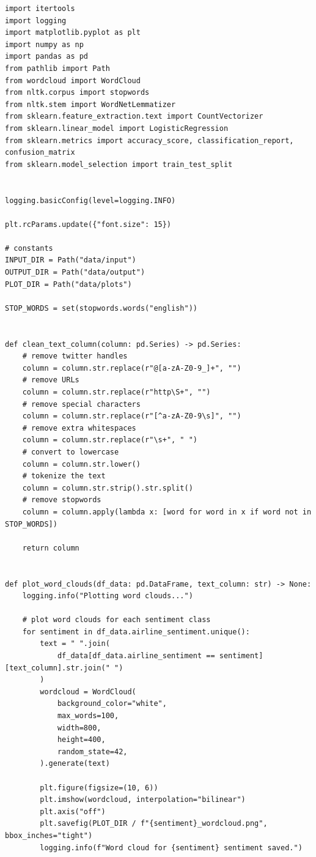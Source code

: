 \documentclass{article}
\begin{document}
\begin{lstlisting}
import itertools
import logging
import matplotlib.pyplot as plt
import numpy as np
import pandas as pd
from pathlib import Path
from wordcloud import WordCloud
from nltk.corpus import stopwords
from nltk.stem import WordNetLemmatizer
from sklearn.feature_extraction.text import CountVectorizer
from sklearn.linear_model import LogisticRegression
from sklearn.metrics import accuracy_score, classification_report, confusion_matrix
from sklearn.model_selection import train_test_split


logging.basicConfig(level=logging.INFO)

plt.rcParams.update({"font.size": 15})

# constants
INPUT_DIR = Path("data/input")
OUTPUT_DIR = Path("data/output")
PLOT_DIR = Path("data/plots")

STOP_WORDS = set(stopwords.words("english"))


def clean_text_column(column: pd.Series) -> pd.Series:
    # remove twitter handles
    column = column.str.replace(r"@[a-zA-Z0-9_]+", "")
    # remove URLs
    column = column.str.replace(r"http\S+", "")
    # remove special characters
    column = column.str.replace(r"[^a-zA-Z0-9\s]", "")
    # remove extra whitespaces
    column = column.str.replace(r"\s+", " ")
    # convert to lowercase
    column = column.str.lower()
    # tokenize the text
    column = column.str.strip().str.split()
    # remove stopwords
    column = column.apply(lambda x: [word for word in x if word not in STOP_WORDS])

    return column


def plot_word_clouds(df_data: pd.DataFrame, text_column: str) -> None:
    logging.info("Plotting word clouds...")

    # plot word clouds for each sentiment class
    for sentiment in df_data.airline_sentiment.unique():
        text = " ".join(
            df_data[df_data.airline_sentiment == sentiment][text_column].str.join(" ")
        )
        wordcloud = WordCloud(
            background_color="white",
            max_words=100,
            width=800,
            height=400,
            random_state=42,
        ).generate(text)

        plt.figure(figsize=(10, 6))
        plt.imshow(wordcloud, interpolation="bilinear")
        plt.axis("off")
        plt.savefig(PLOT_DIR / f"{sentiment}_wordcloud.png", bbox_inches="tight")
        logging.info(f"Word cloud for {sentiment} sentiment saved.")



\end{lstlisting}
\end{document}
